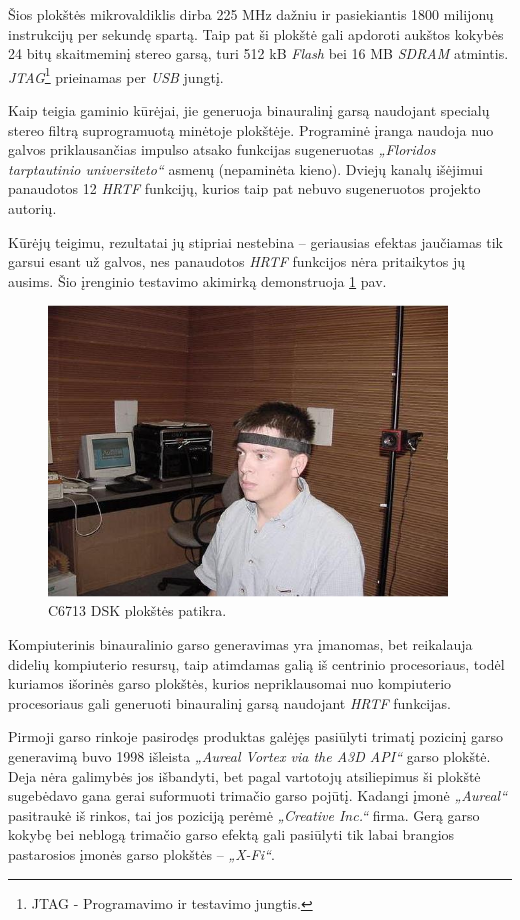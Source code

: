 \documentclass[]{vgtuef}
\begin{document}
Šios plokštės mikrovaldiklis dirba 225 MHz dažniu ir pasiekiantis 1800 milijonų instrukcijų per sekundę spartą. Taip pat ši plokštė gali apdoroti aukštos kokybės 24 bitų skaitmeminį stereo garsą, turi 512 kB \textit{Flash} bei 16 MB \textit{SDRAM} atmintis. \textit{JTAG}\footnote{JTAG - Programavimo ir testavimo jungtis.} prieinamas per \textit{USB} jungtį.

Kaip teigia gaminio kūrėjai, jie generuoja binauralinį garsą naudojant specialų stereo filtrą suprogramuotą minėtoje plokštėje. Programinė įranga naudoja nuo galvos priklausančias impulso atsako funkcijas sugeneruotas \textit{„Floridos tarptautinio universiteto“} asmenų (nepaminėta kieno). Dviejų kanalų išėjimui panaudotos 12 \textit{HRTF} funkcijų, kurios taip pat nebuvo sugeneruotos projekto autorių. 

Kūrėjų teigimu, rezultatai jų stipriai nestebina – geriausias efektas jaučiamas tik garsui esant už galvos, nes panaudotos \textit{HRTF} funkcijos nėra pritaikytos jų ausims. Šio įrenginio testavimo akimirką demonstruoja \ref{fig:C6713_dsk_board_checkout} pav.

\begin{figure}[!ht]
  \centering
  \includegraphics[width=400px]{img/c6713_patikra.jpg}
  \caption{C6713 DSK plokštės patikra.}
  \label{fig:C6713_dsk_board_checkout}
\end{figure}


Kompiuterinis binauralinio garso generavimas yra įmanomas, bet reikalauja didelių kompiuterio resursų, taip atimdamas galią iš centrinio procesoriaus, todėl kuriamos išorinės garso plokštės, kurios nepriklausomai nuo kompiuterio procesoriaus gali generuoti binauralinį garsą naudojant \textit{HRTF} funkcijas.

Pirmoji garso rinkoje pasirodęs produktas galėjęs pasiūlyti trimatį pozicinį garso generavimą buvo 1998 išleista \textit{„Aureal Vortex via the A3D API“} garso plokštė. Deja nėra  galimybės jos išbandyti, bet pagal vartotojų atsiliepimus ši plokštė sugebėdavo gana gerai suformuoti trimačio garso pojūtį. Kadangi įmonė \textit{„Aureal“} pasitraukė iš rinkos, tai jos poziciją perėmė \textit{„Creative Inc.“} firma. Gerą garso kokybę bei neblogą trimačio garso efektą gali pasiūlyti tik labai brangios pastarosios įmonės garso plokštės – \textit{„X-Fi“}. 
\end{document}
